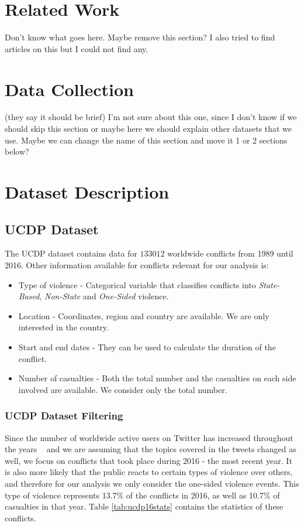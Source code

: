 \documentclass[11pt]{article}
\begin{document}
\section{Related Work}
Don't know what goes here. Maybe remove this section? I also tried to find articles on this but I could not find any.


\section{Data Collection}
(they say it should be brief) I'm not sure about this one, since I don't know if we should skip this section or maybe here we should explain other datasets that we use. Maybe we can change the name of this section and move it 1 or 2 sections below?


\section{Dataset Description}
  \subsection{UCDP Dataset}
  \label{sub:ucdp_dataset}
  The UCDP dataset contains data for $133 012$ worldwide conflicts from 1989 until 2016. Other information available for  conflicts relevant for our analysis is:
  \begin{itemize}
    \item Type of violence - Categorical variable that classifies conflicts into \emph{State-Based},  \emph{Non-State} and \emph{One-Sided} violence.
    \item Location - Coordinates, region and country are available. We are only interested in the country.
    \item Start and end dates - They can be used to calculate the duration of the conflict.
    \item Number of casualties - Both the total number and the casualties on each side involved are available. We consider only the total number.
  \end{itemize}

    \subsubsection*{UCDP Dataset Filtering}
    \label{ssub:dataset_filtering}
    Since the number of worldwide active users on Twitter has increased throughout the years ~\cite{arrojo2015social} and we are assuming that the topics covered in the tweets changed as well, we focus on conflicts that took place during 2016 - the most recent year. It is also more likely that the public reacts to certain types of violence over others, and therefore for our analysis we only consider the one-sided violence events. This type of violence represents 13.7\% of the conflicts in 2016, as well as 10.7\% of casualties in that year. Table \ref{tab:ucdp16stats} contains the statistics of these conflicts.
\end{document}

